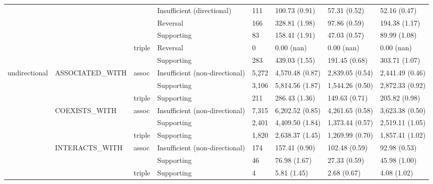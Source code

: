 \begin{tabular}{llllllll}
              &                &        & Insufficient (directional) &            111 &    100.73 (0.91) &     57.31 (0.52) &     52.16 (0.47) \\
              &                &        & Reversal &            166 &    328.81 (1.98) &     97.86 (0.59) &    194.38 (1.17) \\
              &                &        & Supporting &             83 &    158.41 (1.91) &     47.03 (0.57) &     89.99 (1.08) \\
              &                & triple & Reversal &              0 &       0.00 (nan) &       0.00 (nan) &       0.00 (nan) \\
              &                &        & Supporting &            283 &    439.03 (1.55) &    191.45 (0.68) &    303.71 (1.07) \\
undirectional & ASSOCIATED\_WITH & assoc & Insufficient (non-directional) &          5,272 &  4,570.48 (0.87) &  2,839.05 (0.54) &  2,441.49 (0.46) \\
              &                &        & Supporting &          3,106 &  5,814.56 (1.87) &  1,544.26 (0.50) &  2,872.33 (0.92) \\
              &                & triple & Supporting &            211 &    286.43 (1.36) &    149.63 (0.71) &    205.82 (0.98) \\
              & COEXISTS\_WITH & assoc & Insufficient (non-directional) &          7,315 &  6,202.52 (0.85) &  4,261.65 (0.58) &  3,623.38 (0.50) \\
              &                &        & Supporting &          2,401 &  4,409.50 (1.84) &  1,373.44 (0.57) &  2,519.11 (1.05) \\
              &                & triple & Supporting &          1,820 &  2,638.37 (1.45) &  1,269.99 (0.70) &  1,857.41 (1.02) \\
              & INTERACTS\_WITH & assoc & Insufficient (non-directional) &            174 &    157.41 (0.90) &    102.48 (0.59) &     92.98 (0.53) \\
              &                &        & Supporting &             46 &     76.98 (1.67) &     27.33 (0.59) &     45.98 (1.00) \\
              &                & triple & Supporting &              4 &      5.81 (1.45) &      2.68 (0.67) &      4.08 (1.02) \\
\bottomrule
\end{tabular}
